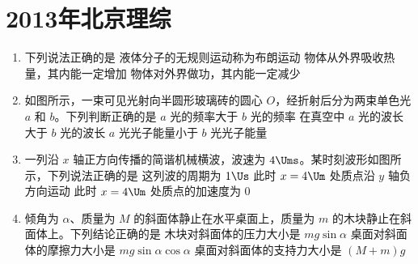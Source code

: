 \documentclass[\gkver]{gaokaozhenti}
\begin{document}
\chapter{2013年北京理综}

\begin{enumerate}
\item
下列说法正确的是
{液体分子的无规则运动称为布朗运动}
{物体从外界吸收热量，其内能一定增加}
{物体对外界做功，其内能一定减少}

\item
如图所示，一束可见光射向半圆形玻璃砖的圆心 $O$，经折射后分为两束单色光 $a$ 和 $b$。下列判断正确的是
{$a$ 光的频率大于 $b$ 光的频率}
{在真空中 $a$ 光的波长大于 $b$ 光的波长}
{$a$ 光光子能量小于 $b$ 光光子能量}

\item
一列沿 $x$ 轴正方向传播的简谐机械横波，波速为 $4\Ums$。某时刻波形如图所示，下列说法正确的是
{这列波的周期为 $1\Us$}
{此时 $x=4\Um$ 处质点沿 $y$ 轴负方向运动}
{此时 $x=4\Um$ 处质点的加速度为 0}

\item
倾角为 $\alpha$、质量为 $M$ 的斜面体静止在水平桌面上，质量为 $m$ 的木块静止在斜面体上。下列结论正确的是
{木块对斜面体的压力大小是 $mg\sin\alpha$}
{桌面对斜面体的摩擦力大小是 $mg\sin\alpha\cos\alpha$}
{桌面对斜面体的支持力大小是 $(M+m)g$}


\end{enumerate}
\end{document}

